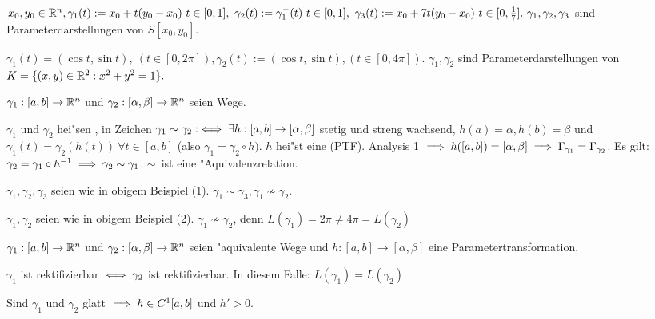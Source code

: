 \documentclass[a4paper,twoside,DIV15,BCOR12mm,chapterprefix=true,headings=twolinechapter]{scrbook}
\begin{document}
\begin{beispiele}
\item $x_0, y_0\in\MdR^n, \gamma_1(t):=x_0+t(y_0-x_0)\ t\in[0,1],\ \gamma_2(t):=\gamma_1^-(t)\ t\in[0,1],\ \gamma_3(t):=x_0+7t(y_0-x_0)\ t\in[0,\frac{1}{7}].\ \gamma_1,\gamma_2,\gamma_3$ sind Parameterdarstellungen von $S[x_0, y_0]$.
\item $\gamma_1(t)=(\cos t, \sin t),\ (t\in [0,2\pi]), \gamma_2(t):=(\cos t, \sin t), (t\in[0,4\pi])$. $\gamma_1, \gamma_2$ sind Parameterdarstellungen von $K=\{(x,y)\in\mathbb{R}^2: x^2+y^2=1\}.$
\end{beispiele}

\begin{definition*}
$\gamma_1:[a,b]\to\mathbb{R}^n$ und $\gamma_2:[\alpha,\beta]\to\mathbb{R}^n$ seien Wege.

$\gamma_1$ und $\gamma_2$ hei"sen , in Zeichen $\gamma_1\sim\gamma_2:\iff\exists h:[a,b]\to[\alpha, \beta]$ stetig und streng wachsend, $h(a)=\alpha, h(b)=\beta$ und $\gamma_1(t)=\gamma_2(h(t))\ \forall t\in[a,b]$ (also $\gamma_1=\gamma_2\circ h)$. $h$ hei"st eine  (PTF). Analysis 1 $\implies h([a,b])=[\alpha,\beta]\implies \Gamma_{\gamma_1}=\Gamma_{\gamma_2}$.
Es gilt: $\gamma_2=\gamma_1\circ h^{-1}\implies \gamma_2\sim\gamma_1$. \glqq$\sim$\grqq\ ist eine "Aquivalenzrelation.
\end{definition*}

\begin{beispiele}
\item $\gamma_1, \gamma_2, \gamma_3$ seien wie in obigem Beispiel (1). $\gamma_1\sim\gamma_3, \gamma_1\nsim\gamma_2$.
\item $\gamma_1, \gamma_2$ seien wie in obigem Beispiel (2). $\gamma_1\nsim\gamma_2$, denn $L(\gamma_1)=2\pi\ne 4\pi=L(\gamma_2)$
\end{beispiele}

\begin{satz}
$\gamma_1:[a,b]\to\mathbb{R}^n$ und $\gamma_2:[\alpha,\beta]\to\mathbb{R}^n$ seien "aquivalente Wege und $h:[a,b]\to[\alpha,\beta]$ eine Parametertransformation.
\begin{liste}
\item $\gamma_1$ ist rektifizierbar $\iff \gamma_2$ ist rektifizierbar. In diesem Falle: $L(\gamma_1)=L(\gamma_2)$
\item Sind $\gamma_1$ und $\gamma_2$ glatt $\implies h\in C^1[a,b]$ und $h'>0$.
\end{liste}
\end{satz}
\end{document}
